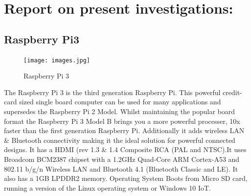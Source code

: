 \chapter{Report on present investigations:}
\section{Raspberry Pi3}{
	\begin{figure}[H]
		\texttt{[image: images.jpg]} %
		\caption{Raspberry Pi 3}
		\label{trans}
	\end{figure}
	The Raspberry Pi 3 is the third generation Raspberry Pi. This powerful
    credit-card sized single board computer can be used for many applications
    and supersedes the Raspberry Pi 2 Model. Whilst maintaining the popular board format the Raspberry Pi 3 Model
    B brings you a more powerful processer, 10x faster than the first generation
    Raspberry Pi. Additionally it adds wireless LAN & Bluetooth connectivity
    making it the ideal solution for powerful connected designs. It has a HDMI (rev 1.3 & 1.4 Composite RCA (PAL and NTSC).It uses Broadcom BCM2387 chipset with a
    1.2GHz Quad-Core ARM Cortex-A53 and 802.11 b/g/n Wireless LAN and Bluetooth 4.1 (Bluetooth Classic and LE). It also has a 1GB LPDDR2 memory. Operating System Boots from Micro SD card, running a version of the Linux operating system or
    Windows 10 IoT.
	
}
